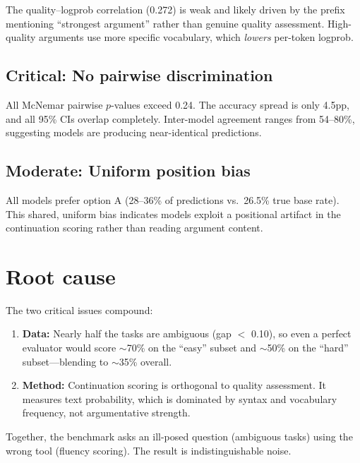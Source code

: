 \documentclass[11pt,a4paper]{article}
\begin{document}
The quality--logprob correlation (0.272) is weak and likely driven by the prefix mentioning ``strongest argument'' rather than genuine quality assessment.
High-quality arguments use more specific vocabulary, which \emph{lowers} per-token logprob.

\subsection{\textcolor{crit}{Critical:} No pairwise discrimination}

All McNemar pairwise $p$-values exceed 0.24. The accuracy spread is only 4.5pp, and all 95\% CIs overlap completely. Inter-model agreement ranges from 54--80\%, suggesting models are producing near-identical predictions.

\subsection{\textcolor{mod}{Moderate:} Uniform position bias}

All models prefer option A (28--36\% of predictions vs.\ 26.5\% true base rate). This shared, uniform bias indicates models exploit a positional artifact in the continuation scoring rather than reading argument content.

\section{Root cause}

The two critical issues compound:

\begin{enumerate}
\item \textbf{Data:} Nearly half the tasks are ambiguous (gap $<$ 0.10), so even a perfect evaluator would score $\sim$70\% on the ``easy'' subset and $\sim$50\% on the ``hard'' subset---blending to $\sim$35\% overall.
\item \textbf{Method:} Continuation scoring is orthogonal to quality assessment. It measures text probability, which is dominated by syntax and vocabulary frequency, not argumentative strength.
\end{enumerate}

Together, the benchmark asks an ill-posed question (ambiguous tasks) using the wrong tool (fluency scoring). The result is indistinguishable noise.

\end{document}
